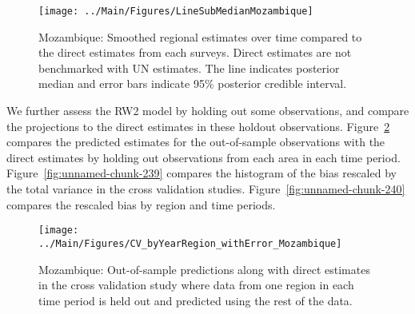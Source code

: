\documentclass[12pt]{article}\usepackage[]{graphicx}\usepackage[]{color}
\newenvironment{knitrout}{}{} %
\begin{document}
\begin{knitrout}
\color{fgcolor}\begin{figure}[bht]

{\centering \texttt{[image: ../Main/Figures/LineSubMedianMozambique]} 

}

\caption[Mozambique]{Mozambique: Smoothed regional estimates over time compared to the direct estimates from each surveys. Direct estimates are not benchmarked with UN estimates. The line indicates posterior median and error bars indicate 95\% posterior credible interval.}\label{fig:unnamed-chunk-237}
\end{figure}


\end{knitrout}
We further assess the RW2 model by holding out some observations, and compare the projections to the direct estimates in these holdout observations. Figure~\ref{fig:unnamed-chunk-238} compares the predicted estimates for the out-of-sample observations  with the direct estimates by holding out observations from each area in each time period.  Figure~\ref{fig:unnamed-chunk-239} compares the histogram of the bias rescaled by the total variance in the cross validation studies. Figure~\ref{fig:unnamed-chunk-240} compares the rescaled bias by region and time periods.



 
\begin{knitrout}
\color{fgcolor}\begin{figure}[bht]

{\centering \texttt{[image: ../Main/Figures/CV\_byYearRegion\_withError\_Mozambique]} 

}

\caption[Mozambique]{Mozambique: Out-of-sample predictions along with direct estimates in the cross validation study where data from one region in each time period is held out and predicted using the rest of the data.}\label{fig:unnamed-chunk-238}
\end{figure}


\end{knitrout}
\end{document}
